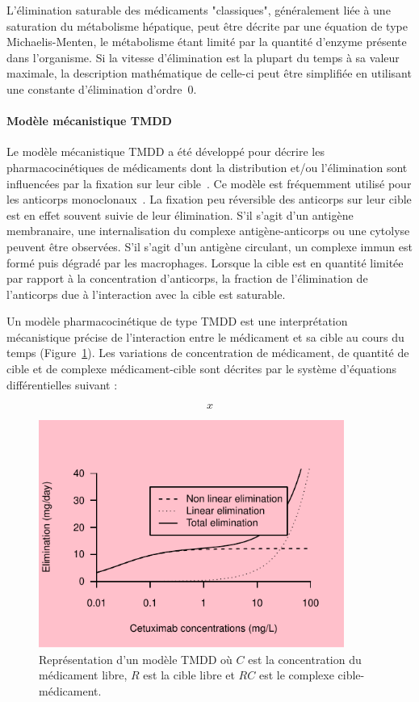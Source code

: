 L'élimination saturable des médicaments "classiques", généralement liée à une saturation du métabolisme hépatique, peut être décrite par une équation de type Michaelis-Menten, le métabolisme étant limité par la quantité d'enzyme présente dans l'organisme. Si la vitesse d'élimination est la plupart du temps à sa valeur maximale, la description mathématique de celle-ci peut être simplifiée en utilisant une constante d'élimination d'ordre~0.
\paragraph{Modèle mécanistique TMDD} Le modèle mécanistique TMDD a été développé pour décrire les pharmacocinétiques de médicaments dont la distribution et/ou l'élimination sont influencées par la fixation sur leur cible~\citep{REF3}. Ce modèle est fréquemment utilisé pour les anticorps monoclonaux~\citep{REF4}. La fixation peu réversible des anticorps sur leur cible est en effet souvent suivie de leur élimination. S'il s'agit d'un antigène membranaire, une internalisation du complexe antigène-anticorps ou une cytolyse peuvent être observées. S'il s'agit d'un antigène circulant, un complexe immun est formé puis dégradé par les macrophages. Lorsque la cible est en quantité limitée par rapport à la concentration d'anticorps, la fraction de l'élimination de l'anticorps due à l'interaction avec la cible est saturable.

Un modèle pharmacocinétique de type TMDD est une interprétation mécanistique précise de l'interaction entre le médicament et sa cible au cours du temps (Figure~\ref{fig:6}). Les variations de concentration de médicament, de quantité de cible et de complexe médicament-cible sont décrites par le système d'équations différentielles suivant :

\begin{equation}
x
\label{eq:33}
\end{equation}

\begin{figure}[htbp]
	\centering
		\includegraphics[width=10cm]{images/essai001.pdf}
	\caption[Représentation d'un modèle TMDD]{Représentation d'un modèle TMDD où $C$ est la concentration du médicament libre, $R$ est la cible libre et $RC$ est le complexe cible-médicament.}
	\label{fig:6}
\end{figure}


